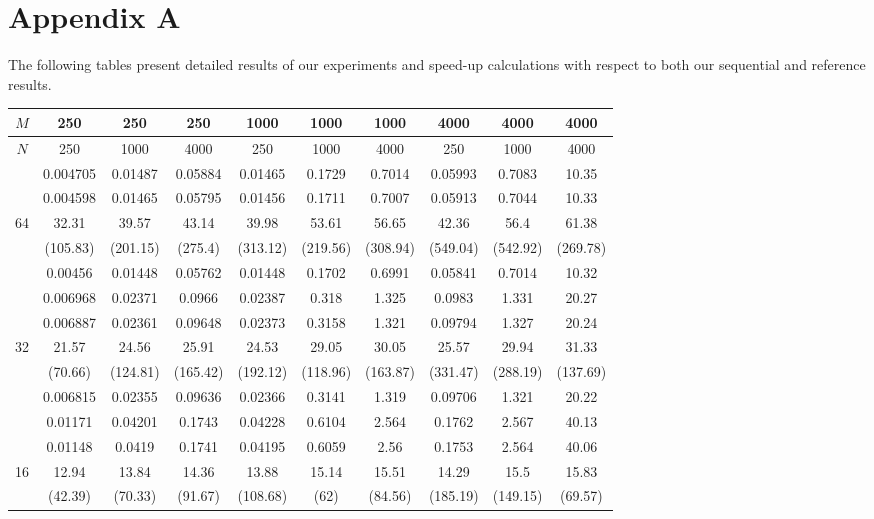 \newpage
\section*{Appendix A}

The following tables present detailed results of our experiments and speed-up calculations with respect to both our sequential and reference results.

\begin{table}[ht]
\centering
\begin{tabular}{c|c|c|c|c|c|c|c|c|c|}
\hline
$M$ & 250 & 250 & 250 & 1000 & 1000 & 1000 & 4000 & 4000 & 4000 \\
\hline
$N$ & 250 & 1000 & 4000 & 250 & 1000 & 4000 & 250 & 1000 & 4000 \\
\hline
 & 0.004705 & 0.01487 & 0.05884 & 0.01465 & 0.1729 & 0.7014 & 0.05993 & 0.7083 & 10.35 \\
 & 0.004598 & 0.01465 & 0.05795 & 0.01456 & 0.1711 & 0.7007 & 0.05913 & 0.7044 & 10.33 \\
64 & 32.31 & 39.57 & 43.14 & 39.98 & 53.61 & 56.65 & 42.36 & 56.4 & 61.38 \\
 & (105.83) & (201.15) & (275.4) & (313.12) & (219.56) & (308.94) & (549.04) & (542.92) & (269.78) \\
 & 0.00456 & 0.01448 & 0.05762 & 0.01448 & 0.1702 & 0.6991 & 0.05841 & 0.7014 & 10.32 \\
\hline
 & 0.006968 & 0.02371 & 0.0966 & 0.02387 & 0.318 & 1.325 & 0.0983 & 1.331 & 20.27 \\
 & 0.006887 & 0.02361 & 0.09648 & 0.02373 & 0.3158 & 1.321 & 0.09794 & 1.327 & 20.24 \\
32 & 21.57 & 24.56 & 25.91 & 24.53 & 29.05 & 30.05 & 25.57 & 29.94 & 31.33 \\
 & (70.66) & (124.81) & (165.42) & (192.12) & (118.96) & (163.87) & (331.47) & (288.19) & (137.69) \\
 & 0.006815 & 0.02355 & 0.09636 & 0.02366 & 0.3141 & 1.319 & 0.09706 & 1.321 & 20.22 \\
\hline
 & 0.01171 & 0.04201 & 0.1743 & 0.04228 & 0.6104 & 2.564 & 0.1762 & 2.567 & 40.13 \\
 & 0.01148 & 0.0419 & 0.1741 & 0.04195 & 0.6059 & 2.56 & 0.1753 & 2.564 & 40.06 \\
16 & 12.94 & 13.84 & 14.36 & 13.88 & 15.14 & 15.51 & 14.29 & 15.5 & 15.83 \\
 & (42.39) & (70.33) & (91.67) & (108.68) & (62) & (84.56) & (185.19) & (149.15) & (69.57) \\

\end{tabular}
\end{table}
